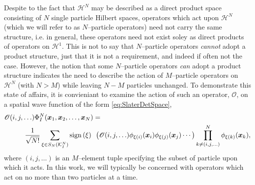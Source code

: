 Despite to the fact that $\mathcal{H}^N$ may be described as a direct product space consisting of $N$ single particle
Hilbert spaces, operators which act upon $\mathcal{H}^N$ (which we will refer to as $N$--particle operators) need not carry the same structure, 
i.e. in general, these operators need not exist soley as direct products of operators on $\mathcal{H}^1$. This is not to say
that $N$--particle operators \emph{cannot} adopt a product structure, just that it is not a requirement, and indeed
if often not the case. However, the notion that some $N$--particle operators \emph{can} adopt a product structure indicates the need
to describe the action of $M$--particle operators on $\mathcal{H}^N$ (with $N>M$) while leaving $N-M$ particles unchanged.
To demonstrate this state of affairs, it is convieniant to examine the action of such an operator, $\mathscr{O}$, on a 
spatial wave function of the form \cref{eq:SlaterDetSpace},
\begin{align}
  \label{eq:MOpSpace}
  &\mathscr{O}(i,j,\ldots) \Phi_I^N(\boldsymbol{x}_1,\boldsymbol{x}_2,\ldots,\boldsymbol{x}_N) = \nonumber \\ &\qquad \quad
    \frac{1}{\sqrt{N!}} \sum_{\xi \in S_N(\mathcal{K}^N_I)} \mathrm{sign}\left( \xi \right) \text{ } 
    \left(\mathscr{O}(i,j,\ldots) \phi_{\xi(i)}(\boldsymbol{x}_i)\phi_{\xi(j)}(\boldsymbol{x}_j)\cdots\right)
    \prod_{k \neq (i,j,\ldots) }^{N} \phi_{\xi(k)}(\boldsymbol{x}_k),
\end{align}
where $(i,j,\ldots)$ is an $M$--element tuple specifying the subset of particle upon which it acts.
In this work, we will typically be concerned with operators which act on no more than two particles at a time.

